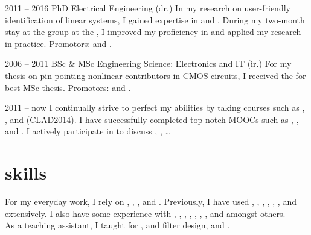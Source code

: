 \documentclass{cv-egeerardyn}
\begin{document}
\begin{education}
  \addEducation%
  {2011 -- 2016}%
  {PhD Electrical Engineering (dr.)}%
  {\VUB}%
  {In my research on user-friendly identification of linear systems, I gained expertise in  and . During my two-month stay at the \CST{} group at the \TUe, I improved my proficiency in  and applied my research in practice.
  Promotors: \JohanSchoukens{} and \TomOomen.}

  \addEducation%
  {2006 -- 2011}%
  {BSc \& MSc Engineering Science: Electronics  and IT (ir.)}%
  {\VUB}%
  {For my thesis on pin-pointing nonlinear contributors in CMOS circuits, I received the  for best MSc thesis.
  Promotors: \PietWambacq{} and \GerdVandersteen.}

  \addText%
  {\vspace{-5.35\baselineskip}2011 -- now}%
  {I continually strive to perfect my abilities by taking courses such as , , and  (CLAD2014). 
  I have successfully completed top-notch MOOCs such as 
     , 
     , 
      and 
     .
  I actively participate in  to discuss , , \ldots}
\end{education}

\begin{languages}
\end{languages}

\section{skills}
For my everyday work, I rely on , ,  , and .
Previously, I have used , , , , , , and  extensively.
I also have some experience with , , , , , , , and  amongst others.\\
As a teaching assistant, I taught  for ,  and filter design, and .
\end{document}
